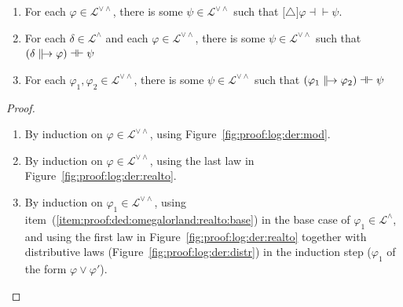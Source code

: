 \documentclass[%
  a4paper,
  UKenglish,
  cleveref,
  autoref,
  thm-restate,
  numberwithinsect,
]{lipics-v2021}
\newcommand\defthesisiff{\dashv\vdash}
\newcommand\thesisiff{\mathrel{\defthesisiff}}
\newcommand\defrealto{\mathrel\parallel\joinrel\to}
\newcommand\realto{\mathrel{\defrealto}}
\newcommand\Lang{\mathcal{L}}
\newcommand\form[1]{\lbrack #1 \rbrack}
\newcommand\modgen{\mathord{\triangle}}	%
\begin{document}
\begin{lemma}
\label{lem:proof:ded:omegalorland:prelim}
\begin{enumerate}[(1)]
\item
\label{item:proof:ded:omegalorland:mod}
For each $\varphi \in \Lang^{\lor\land}$,
there is some $\psi \in \Lang^{\lor\land}$
such that $\form{\modgen}\varphi \thesisiff \psi$.

\item
\label{item:proof:ded:omegalorland:realto:base}
For each $\delta \in \Lang^{\land}$
and each $\varphi \in \Lang^{\lor\land}$,
there is some $\psi \in \Lang^{\lor\land}$
such that $(\delta \realto \varphi) \thesisiff \psi$

\item
\label{item:proof:ded:omegalorland:realto}
For each $\varphi_1, \varphi_2 \in \Lang^{\lor\land}$,
there is some $\psi \in \Lang^{\lor\land}$
such that $(\varphi_1 \realto \varphi_2) \thesisiff \psi$
\end{enumerate}
\end{lemma}

\begin{proof}
\begin{enumerate}[(1)]
\item 
By induction on $\varphi \in \Lang^{\lor\land}$,
using Figure~\ref{fig:proof:log:der:mod}.

\item
By induction on $\varphi \in \Lang^{\lor\land}$,
using the last law in Figure~\ref{fig:proof:log:der:realto}.

\item 
By induction on $\varphi_1 \in \Lang^{\lor\land}$,
using item~(\ref{item:proof:ded:omegalorland:realto:base})
in the base case of $\varphi_1 \in \Lang^\land$,
and using the first law in Figure~\ref{fig:proof:log:der:realto}
together with distributive laws
(Figure~\ref{fig:proof:log:der:distr})
in the induction step ($\varphi_1$ of the form $\varphi \lor \varphi'$).
\qedhere
\end{enumerate}
\end{proof}
\end{document}
